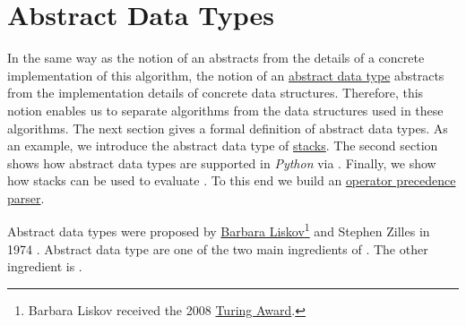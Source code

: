 \chapter{Abstract Data Types}
In the same way as the notion of an  abstracts from the details of a concrete
implementation of this algorithm, the notion of an \href{https://en.wikipedia.org/wiki/Abstract_data_type}{abstract data type} abstracts from the implementation
details of concrete data structures.  Therefore, this notion enables us to separate algorithms from the data
structures used in these algorithms.  The next section gives a formal definition of
abstract data types.  As an example, we introduce the abstract data type of
\href{https://en.wikipedia.org/wiki/Stack_(abstract_data_type)}{stacks}.
The second section shows how abstract data types are supported in \textsl{Python} via .  Finally,
we show how stacks can be used 
to evaluate .  To this end we build an
\href{https://en.wikipedia.org/wiki/Operator-precedence_parser}{operator precedence parser}. 

Abstract data types were proposed by 
\href{https://en.wikipedia.org/wiki/Barbara_Liskov}{Barbara Liskov}\footnote{
  Barbara Liskov received the 2008 \href{https://en.wikipedia.org/wiki/Turing_Award}{Turing Award}.}
and Stephen Zilles in 1974 \cite{liskov:1974}.  Abstract data type are one of the two main ingredients of
.  The other ingredient is .

